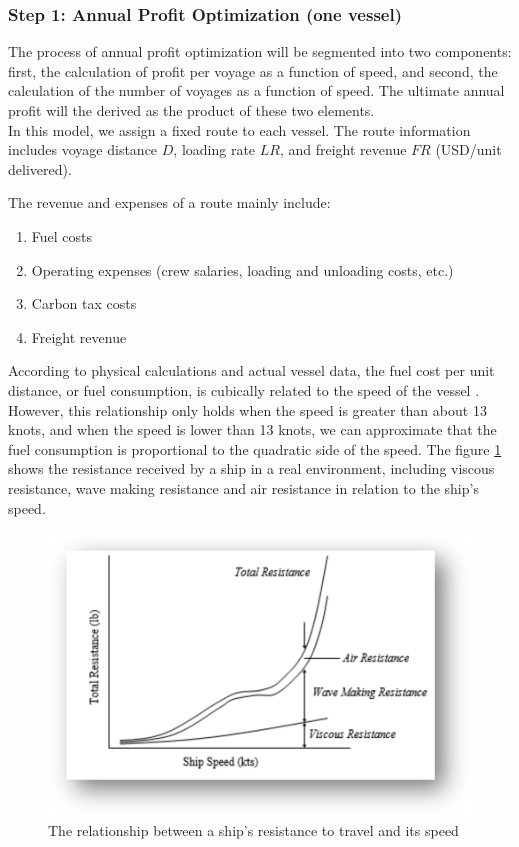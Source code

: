 \documentclass[a4paper,12pt]{article}
\begin{document}
\subsubsection{Step 1: Annual Profit Optimization (one vessel)}

The process of annual profit optimization will be segmented into two components: first, the calculation of profit per voyage as a function of speed, and second, the calculation of the number of voyages as a function of speed.
The ultimate annual profit will the derived as the product of these two elements.\\

In this model, we assign a fixed route to each vessel. The route information includes voyage distance $D$, loading rate $LR$, and freight revenue $FR$ (USD/unit delivered).

The revenue and expenses of a route mainly include:
\begin{enumerate}
	\item Fuel costs
	\item Operating expenses (crew salaries, loading and unloading costs, etc.)
	\item Carbon tax costs
	\item Freight revenue
\end{enumerate}

According to physical calculations and actual vessel data, the fuel cost per unit distance, or fuel consumption, is cubically related to the speed of the vessel \cite{elkafas2023environmental}.
However, this relationship only holds when the speed is greater than about 13 knots, and when the speed is lower than 13 knots, we can approximate that the fuel consumption is proportional to the quadratic side of the speed.
The figure \ref{fig:resistance} shows the resistance received by a ship in a real environment, including viscous resistance, wave making resistance and air resistance in relation to the ship's speed.

\begin{figure}[H]
	\centering
	\includegraphics[width=0.5\linewidth]{report-fig/resistance.png}
	\caption{The relationship between a ship's resistance to travel and its speed}
	\label{fig:resistance}
\end{figure}
\end{document}
